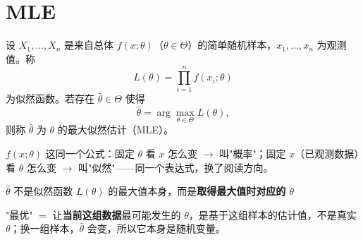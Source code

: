\section{MLE}
\begin{definition}[最大似然估计]
设 $X_1,\ldots,X_n$ 是来自总体 $f(x;\theta)$（$\theta\in\Theta$）的简单随机样本，$x_1,\ldots,x_n$ 为观测值。称
\[
L(\theta)=\prod_{i=1}^n f(x_i;\theta)
\]
为似然函数。若存在 $\hat\theta\in\Theta$ 使得
\[
\hat\theta=\arg\max_{\theta\in\Theta}L(\theta),
\]
则称 $\hat\theta$ 为 $\theta$ 的最大似然估计（MLE）。
\end{definition}
\begin{dxtips}
$f(x;\theta)$ 这同一个公式：固定 $\theta$ 看 $x$ 怎么变 $\to$ 叫"概率"；固定 $x$（已观测数据）看 $\theta$ 怎么变 $\to$ 叫"似然"——同一个表达式，换了阅读方向。

$\hat\theta$ 不是似然函数 $L(\theta)$ 的最大值本身，而是\textbf{取得最大值时对应的 $\theta$}

"最优" $=$ 让\textbf{当前这组数据}最可能发生的 $\theta$，是基于这组样本的估计值，不是真实 $\theta$；换一组样本，$\hat\theta$ 会变，所以它本身是随机变量。
\end{dxtips}
